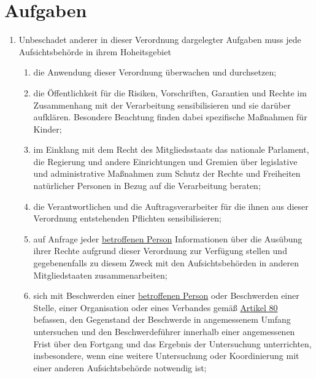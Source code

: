 \chapter{Aufgaben}
\label{ch:57}


\begin{enumerate}

  \item Unbeschadet anderer in dieser Verordnung dargelegter Aufgaben muss jede Aufsichtsbehörde in ihrem Hoheitsgebiet
\label{itm:57-1}

  \begin{enumerate}
  
    \item die Anwendung dieser Verordnung überwachen und durchsetzen;
    \label{itm:57-1a}

    \item die Öffentlichkeit für die Risiken, Vorschriften, Garantien und Rechte im Zusammenhang mit der Verarbeitung
     sensibilisieren und sie darüber aufklären. Besondere Beachtung finden dabei spezifische Maßnahmen für Kinder;
    \label{itm:57-1b}

    \item im Einklang mit dem Recht des Mitgliedsstaats das nationale Parlament, die Regierung und andere Einrichtungen
     und Gremien über legislative und administrative Maßnahmen zum Schutz der Rechte und Freiheiten natürlicher
     Personen in Bezug auf die Verarbeitung beraten;
    \label{itm:57-1c}

    \item die Verantwortlichen und die Auftragsverarbeiter für die ihnen aus dieser Verordnung entstehenden Pflichten
     sensibilisieren;
    \label{itm:57-1d}

    \item auf Anfrage jeder \hyperref[itm:04-1]{betroffenen Person} Informationen über die Ausübung ihrer Rechte aufgrund dieser Verordnung
     zur Verfügung stellen und gegebenenfalls zu diesem Zweck mit den Aufsichtsbehörden in anderen Mitgliedstaaten
     zusammenarbeiten;
    \label{itm:57-1e}

    \item sich mit Beschwerden einer \hyperref[itm:04-1]{betroffenen Person} oder Beschwerden einer Stelle, einer Organisation oder eines
     Verbandes gemäß \hyperref[ch:80]{Artikel 80} befassen, den Gegenstand der Beschwerde in angemessenem Umfang
     untersuchen und den Beschwerdeführer innerhalb einer angemessenen Frist über den Fortgang und das Ergebnis der
     Untersuchung unterrichten, insbesondere, wenn eine weitere Untersuchung oder Koordinierung mit einer anderen
     Aufsichtsbehörde notwendig ist;
    \label{itm:57-1f}


\end{enumerate}
\end{enumerate}
